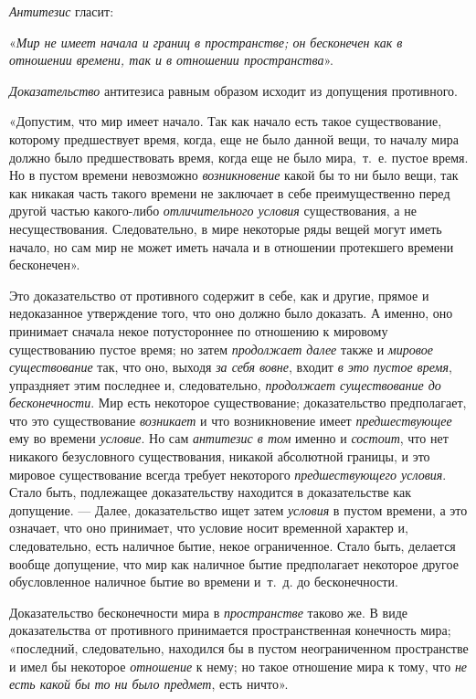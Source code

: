 {\em Антитезис} гласит:

«{\em Мир не имеет начала и границ в пространстве; он
бесконечен как в отношении времени, так и в отношении пространства}».

{\em Доказательство} антитезиса равным образом исходит
из допущения противного.

«Допустим, что мир имеет начало. Так как начало есть такое существование,
которому предшествует время, когда, еще не было данной вещи, то началу мира
должно было предшествовать время, когда еще не было мира,~т.~е. пустое
время. Но в пустом времени невозможно
{\em возникновение} какой бы то ни было вещи, так как
никакая часть такого времени не заключает в себе преимущественно перед
другой частью какого-либо {\em отличительного условия}
существования, а не несуществования. Следовательно, в мире некоторые ряды
вещей могут иметь начало, но сам мир не может иметь начала и в отношении
протекшего времени бесконечен».

Это доказательство от противного содержит в себе, как и другие, прямое и
недоказанное утверждение того, что оно должно было доказать. А именно, оно
принимает сначала некое потустороннее по отношению к мировому существованию
пустое время; но затем {\em продолжает далее} также и
{\em мировое существование} так, что оно, выходя
{\em за себя вовне}, входит {\em в
это пустое время}, упраздняет этим последнее и, следовательно,
{\em продолжает существование до бесконечности}. Мир
есть некоторое существование; доказательство предполагает, что это
существование {\em возникает} и что возникновение имеет
{\em предшествующее} ему во времени
{\em условие}. Но сам
{\em антитезис в том} именно и
{\em состоит}, что нет никакого безусловного
существования, никакой абсолютной границы, и это мировое существование
всегда требует некоторого {\em предшествующего
условия}. Стало быть, подлежащее доказательству находится в доказательстве
как допущение. — Далее, доказательство ищет затем
{\em условия} в пустом времени, а это означает, что оно
принимает, что условие носит временной характер и, следовательно, есть
наличное бытие, некое ограниченное. Стало быть, делается вообще допущение,
что мир как наличное бытие предполагает некоторое другое обусловленное
наличное бытие во времени и~т.~д. до бесконечности.

Доказательство бесконечности мира в {\em пространстве}
таково же. В виде доказательства от противного принимается пространственная
конечность мира; «последний, следовательно, находился бы в пустом
неограниченном пространстве и имел бы некоторое
{\em отношение} к нему; но такое отношение мира к тому,
что {\em не есть какой бы то ни было предмет}, есть
ничто».

